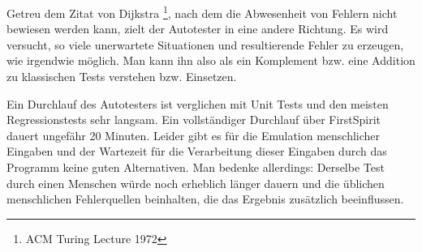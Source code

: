 Getreu dem Zitat von Dijkstra \footnote{ACM Turing Lecture 1972},
nach dem die Abwesenheit von Fehlern nicht bewiesen werden kann,
zielt der Autotester in eine andere Richtung. Es wird versucht, so viele
unerwartete Situationen und resultierende Fehler zu erzeugen, wie
irgendwie möglich. Man kann ihn also als ein Komplement bzw. eine Addition
zu klassischen Tests verstehen bzw. Einsetzen.

Ein Durchlauf des Autotesters ist verglichen mit Unit Tests und den
meisten Regressionstests sehr langsam. Ein vollständiger Durchlauf
über FirstSpirit dauert ungefähr 20 Minuten. Leider gibt es für die
Emulation menschlicher Eingaben und der Wartezeit für die Verarbeitung
dieser Eingaben durch das Programm keine guten Alternativen.
Man bedenke allerdings: Derselbe Test durch einen Menschen würde
noch erheblich länger dauern und die üblichen menschlichen Fehlerquellen
beinhalten, die das Ergebnis zusätzlich beeinflussen.
